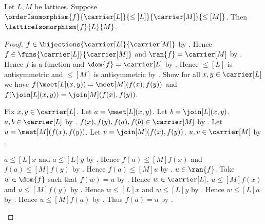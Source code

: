 \begin{theorem}\label{order_isomorphism_between_lattices_is_lattice_isomorphism}
    Let $L,M$ be lattices.
    Suppose
        $\orderIsomorphism
            {f}{\carrier[L]}{\leq[L]}{\carrier[M]}{\leq[M]}$.
    Then $\latticeIsomorphism{f}{L}{M}$.
\end{theorem}
\begin{proof}
    $f\in\bijections{\carrier[L]}{\carrier[M]}$ by
        .
    Hence $f\in\funs{\carrier[L]}{\carrier[M]}$ and
        $\ran{f}=\carrier[M]$ by
        .
    Hence $f$ is a function and $\dom{f}=\carrier[L]$ by
        .
    Hence $\leq[L]$ is antisymmetric and $\leq[M]$ is antisymmetric by
        .
    Show for all $x,y\in\carrier[L]$ we have
        $f(\meet[L](x,y))=\meet[M](f(x),f(y))$ and
        $f(\join[L](x,y))=\join[M](f(x),f(y))$.
    \begin{subproof}
        Fix $x,y\in\carrier[L]$.
        Let $a=\meet[L](x,y)$.
        Let $b=\join[L](x,y)$.
        $a,b\in\carrier[L]$ by
            .
        $f(x),f(y),f(a),f(b)\in\carrier[M]$ by
            .
        Let $u=\meet[M](f(x),f(y))$.
        Let $v=\join[M](f(x),f(y))$.
        $u,v\in\carrier[M]$ by
            .

        $a\mathrel{\leq[L]}x$ and $a\mathrel{\leq[L]}y$ by
            .
        Hence $f(a)\mathrel{\leq[M]}f(x)$ and
            $f(a)\mathrel{\leq[M]}f(y)$ by
            .
        Hence $f(a)\mathrel{\leq[M]}u$ by
            .
        $u\in\ran{f}$.
        Take $w\in\dom{f}$ such that $f(w)=u$ by
            .
        Hence $w\in\carrier[L]$.
        $u\mathrel{\leq[M]}f(x)$ and
            $u\mathrel{\leq[M]}f(y)$ by
            .
        Hence $w\mathrel{\leq[L]}x$ and
            $w\mathrel{\leq[L]}y$ by
            .
        Hence $w\mathrel{\leq[L]}a$ by
            .
        Hence $u\mathrel{\leq[M]}f(a)$ by
            .
        Thus $f(a)=u$ by .


\end{subproof}
\end{proof}
